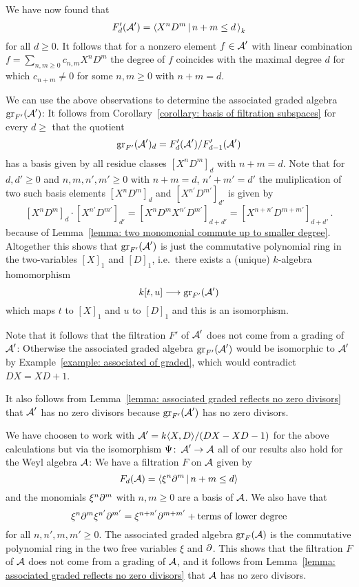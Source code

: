 \begin{fluff}
  We have now found that
  \[
      F'_d(\weyl')
    = \gen{
        X^n D^m
      \suchthat
        n + m \leq d
        \,
      }_k
  \]
  for all $d \geq 0$.
  It follows that for a nonzero element $f \in \operatorname{\mathcal{A}}'$ with linear combination $f = \sum_{n, m \geq 0} c_{n,m} X^n D^m$ the degree of $f$ coincides with the maximal degree $d$ for which $c_{n+m} \neq 0$ for some $n, m \geq 0$ with $n+m = d$.
  
  We can use the above observations to determine the associated graded algebra $\operatorname{gr}_{F'}(\operatorname{\mathcal{A}}')$:
  It follows from Corollary~\ref{corollary: basis of filtration subspaces} for every $d \geq $ that the quotient
  \[
      \operatorname{gr}_{F'}(\operatorname{\mathcal{A}}')_d
    = F'_d(\operatorname{\mathcal{A}}') / F'_{d-1}(\operatorname{\mathcal{A}}')
  \]
  has a basis given by all residue classes $[X^n D^m]_d$ with $n + m = d$.
  Note that for $d, d' \geq 0$ and $n,m,n',m' \geq 0$ with $n + m = d$, $n' + m' = d'$ the muliplication of two such basis elements $[X^n D^m]_d$ and $[X^{n'} D^{m'}]_{d'}$ is given by
  \[
      [X^n D^m]_d \cdot [X^{n'} D^{m'}]_{d'}
    = [X^n D^m X^{n'} D^{m'}]_{d + d'}
    = [X^{n + n'} D^{m + m'}]_{d + d'} \,.
  \]
  because of Lemma~\ref{lemma: two monomonial commute up to smaller degree}.
  Altogether this shows that $\operatorname{gr}_{F'}(\operatorname{\mathcal{A}}')$ is just the commutative polynomial ring in the two-variables $[X]_1$ and $[D]_1$, i.e.\ there exists a (unique) $k$-algebra homomorphism
  \[
            k[t,u]
    \longrightarrow \operatorname{gr}_{F'}(\operatorname{\mathcal{A}}')
  \]
  which maps $t$ to $[X]_1$ and $u$ to $[D]_1$ and this is an isomorphism.
  
  Note that it follows that the filtration $F'$ of $\operatorname{\mathcal{A}}'$ does not come from a grading of~$\operatorname{\mathcal{A}}'$:
  Otherwise the associated graded algebra $\operatorname{gr}_{F'}(\operatorname{\mathcal{A}}')$ would be isomorphic to $\operatorname{\mathcal{A}}'$ by Example~\ref{example: associated of graded}, which would contradict $DX = XD + 1$.
  
  It also follows from Lemma~\ref{lemma: associated graded reflects no zero divisors} that $\operatorname{\mathcal{A}}'$ has no zero divisors because $\operatorname{gr}_{F'}(\operatorname{\mathcal{A}}')$ has no zero divisors.
\end{fluff}


\begin{fluff}
  \label{fluff: associated graded of weyl algebra}
  We have choosen to work with $\operatorname{\mathcal{A}}' = k\langle X,D \rangle/(DX-XD-1)$ for the above calculations but via the isomorphism $\Psi \colon \operatorname{\mathcal{A}}' \to \operatorname{\mathcal{A}}$ all of our results also hold for the Weyl algebra $\operatorname{\mathcal{A}}$:
  We have a filtration $F$ on $\operatorname{\mathcal{A}}$ given by
  \[
      F_d(\weyl)
    = \gen{ \xi^n \del^m \suchthat n + m \leq d }
  \]
  and the monomials $\xi^n \partial^m$ with $n, m \geq 0$ are a basis of $\operatorname{\mathcal{A}}$.
  We also have that
  \[
      \xi^n \partial^m \xi^{n'} \partial^{m'}
    =   \xi^{n + n'} \partial^{m + m'}
      + \text{terms of lower degree}
  \]
  for all $n, n', m, m' \geq 0$.
  The associated graded algebra $\operatorname{gr}_F(\operatorname{\mathcal{A}})$ is the commutative polynomial ring in the two free variables $\xi$ and $\partial$.
  This shows that the filtration $F$ of $\operatorname{\mathcal{A}}$ does not come from a grading of $\operatorname{\mathcal{A}}$, and it follows from Lemma~\ref{lemma: associated graded reflects no zero divisors} that $\operatorname{\mathcal{A}}$ has no zero divisors.
\end{fluff}


